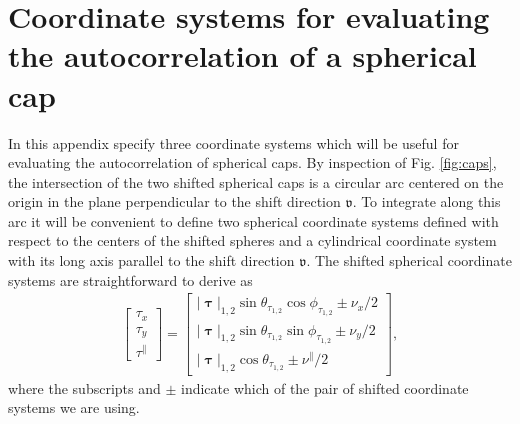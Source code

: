 \documentclass[]{osa-article}
\newcommand{\mypar}{\parallel}
\providecommand{\bs}[1]{\boldsymbol{#1}}
\providecommand{\bv}{\boldsymbol{\mathfrak{v}}}
\providecommand{\bvpar}{\nu^{\parallel}}
\providecommand{\bt}{\bs{\uptau}}
\providecommand{\btpar}{\tau^{\mypar}}
\begin{document}
\section{Coordinate systems for evaluating the autocorrelation of a spherical cap}\label{sec:coord}
In this appendix specify three coordinate systems which will be useful for evaluating the autocorrelation of spherical caps. By inspection of Fig. \ref{fig:caps}, the intersection of the two shifted spherical caps is a circular arc centered on the origin in the plane perpendicular to the shift direction $\bv$. To integrate along this arc it will be convenient to define two spherical coordinate systems defined with respect to the centers of the shifted spheres and a cylindrical coordinate system with its long axis parallel to the shift direction $\bv$. The shifted spherical coordinate systems are straightforward to derive as
\begin{align}
  \begin{bmatrix}
    \tau_x\\
    \tau_y\\
    \btpar
  \end{bmatrix}
  =
  \begin{bmatrix}
    |\bt|_{1,2}\sin\theta_{\tau_{1,2}}\cos\phi_{\tau_{1,2}} \pm \nu_x/2\\
    |\bt|_{1,2}\sin\theta_{\tau_{1,2}}\sin\phi_{\tau_{1,2}} \pm \nu_y/2\\
    |\bt|_{1,2}\cos\theta_{\tau_{1,2}} \pm \bvpar/2
  \end{bmatrix},\label{eq:spherical}
\end{align}
where the subscripts and $\pm$ indicate which of the pair of shifted coordinate systems we are using.
\end{document}
